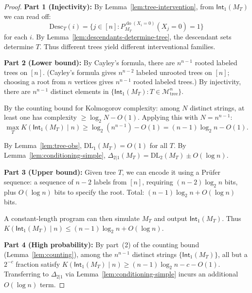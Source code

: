 \documentclass[10pt,a4paper]{amsart}
\newcommand{\DL}{\mathrm{DL}}
\newcommand{\Desc}{\mathrm{Desc}}
\newcommand{\Int}{\mathsf{Int}}
\newcommand{\calM}{\mathcal{M}}
\DeclareMathOperator{\doop}{do}
\begin{document}
\begin{proof}
\textbf{Part 1 (Injectivity):} By Lemma~\ref{lem:tree-intervention}, from $\Int_1(M_T)$ we can read off:
\[
\Desc_T(i) = \{j \in [n] : P_{M_T}^{\doop(X_i = 0)}(X_j = 0) = 1\}
\]
for each $i$. By Lemma~\ref{lem:descendants-determine-tree}, the descendant sets determine $T$. Thus different trees yield different interventional families.

\textbf{Part 2 (Lower bound):} By Cayley's formula, there are $n^{n-1}$ rooted labeled trees on $[n]$. (Cayley's formula gives $n^{n-2}$ labeled unrooted trees on $[n]$; choosing a root from $n$ vertices gives $n^{n-1}$ rooted labeled trees.) By injectivity, there are $n^{n-1}$ distinct elements in $\{\Int_1(M_T) : T \in \calM_{\mathrm{tree}}^n\}$.

By the counting bound for Kolmogorov complexity: among $N$ distinct strings, at least one has complexity $\geq \log_2 N - O(1)$. Applying this with $N = n^{n-1}$:
\[
\max_T K(\Int_1(M_T) \mid n) \geq \log_2(n^{n-1}) - O(1) = (n-1)\log_2 n - O(1).
\]

By Lemma~\ref{lem:tree-obs}, $\DL_1(M_T) = O(1)$ for all $T$. By Lemma~\ref{lem:conditioning-simple}, $\Delta_{2|1}(M_T) = \DL_2(M_T) \pm O(\log n)$.

\textbf{Part 3 (Upper bound):} Given tree $T$, we can encode it using a Pr\"ufer sequence: a sequence of $n-2$ labels from $[n]$, requiring $(n-2)\log_2 n$ bits, plus $O(\log n)$ bits to specify the root. Total: $(n-1)\log_2 n + O(\log n)$ bits.

A constant-length program can then simulate $M_T$ and output $\Int_1(M_T)$. Thus $K(\Int_1(M_T) \mid n) \leq (n-1)\log_2 n + O(\log n)$.

\textbf{Part 4 (High probability):} By part~(2) of the counting bound (Lemma~\ref{lem:counting}), among the $n^{n-1}$ distinct strings $\{\Int_1(M_T)\}$, all but a $2^{-c}$ fraction satisfy $K(\Int_1(M_T) \mid n) \geq (n-1)\log_2 n - c - O(1)$. Transferring to $\Delta_{2|1}$ via Lemma~\ref{lem:conditioning-simple} incurs an additional $O(\log n)$ term.
\end{proof}
\end{document}
